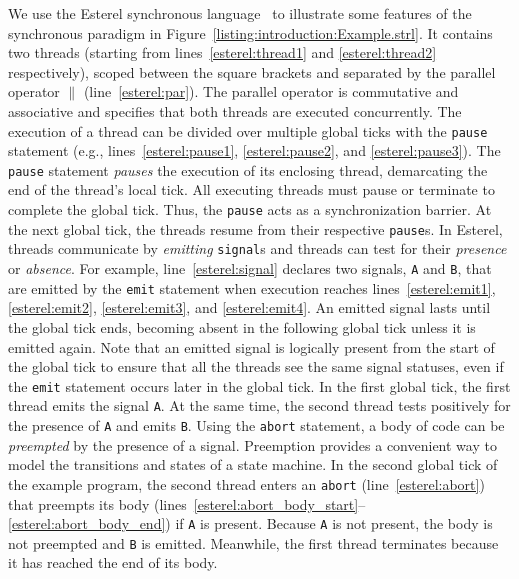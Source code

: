 We use the Esterel synchronous language~\cite{timed_esterel}
to illustrate some features of the synchronous paradigm in
Figure~\ref{listing:introduction:Example.strl}. It contains
two threads (starting from lines~\ref{esterel:thread1} and
\ref{esterel:thread2} respectively), scoped between the square brackets
and separated by the parallel operator $\parallel$
(line~\ref{esterel:par}). The parallel operator is
commutative and associative and specifies that both threads
are executed concurrently. The execution of a thread can be
divided over multiple global ticks with the \verb$pause$
statement (e.g., lines~\ref{esterel:pause1},
\ref{esterel:pause2}, and \ref{esterel:pause3}). The
\verb$pause$ statement \emph{pauses} the execution of its enclosing
thread, demarcating the end of the thread's local tick. All
executing threads must pause or terminate to complete the global
tick. Thus, the \verb$pause$ acts as a
synchronization barrier. At the next global tick, the
threads resume from their respective \verb$pause$s. In Esterel, threads
communicate by \emph{emitting} \verb$signal$s and threads can test
for their \emph{presence} or \emph{absence}. For example,
line~\ref{esterel:signal} declares two signals, \verb$A$ and
\verb$B$, that are emitted by the \verb$emit$ statement when
execution reaches lines~\ref{esterel:emit1},
\ref{esterel:emit2}, \ref{esterel:emit3}, and
\ref{esterel:emit4}. An emitted
signal lasts until the global tick ends, becoming absent in
the following global tick unless it is emitted again. Note
that an emitted signal is logically present from the start of the
global tick to ensure that all the threads see the same
signal statuses, even if the \texttt{emit} statement occurs
later in the global tick. In the first global tick, the
first thread emits the signal \verb$A$. At the same time, 
the second thread tests positively for the
presence of \verb$A$ and emits \verb$B$.
Using the \verb$abort$ statement, a body of code can be
\emph{preempted} by the presence of a signal. Preemption provides a
convenient way to model the transitions and states of a
state machine. In the second global tick of the example
program, the second thread enters an \verb$abort$
(line~\ref{esterel:abort}) that preempts its body
(lines~\ref{esterel:abort_body_start}--\ref{esterel:abort_body_end}) 
if \verb$A$ is present.
Because \verb$A$ is not present, the body is not preempted
and \verb$B$ is emitted. Meanwhile, the first thread
terminates because it has reached the end of its body.


